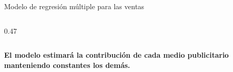\documentclass[aspectratio=169,11pt]{beamer}
\newcommand{\destaca}[1]{%
  {\color{cPrim}\bfseries #1}%
}
\begin{document}
\begin{frame}{Modelo de regresión múltiple para las ventas}
\begin{center}
\begin{minipage}{0.90\textwidth}
\begin{columns}[T,onlytextwidth]
\begin{column}{0.47\textwidth}
        \end{column}

      \end{columns}

      \vspace{0.35em}

      \begin{center}
        \destaca{El modelo estimará la contribución de cada medio
        publicitario manteniendo constantes los demás.}
      \end{center}

    \end{minipage}
  \end{center}

\end{frame}
\end{document}
